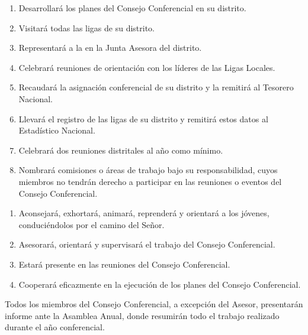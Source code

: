 \begin{enumerate}[noitemsep]
    \item Desarrollará los planes del Consejo Conferencial en su distrito.
    \item Visitará todas las ligas de su distrito.
    \item Representará a la \LMJ{} en la Junta Asesora del distrito.
    \item Celebrará reuniones de orientación con los líderes de las Ligas Locales.
    \item Recaudará la asignación conferencial de su distrito y la remitirá al Tesorero Nacional.
    \item Llevará el registro de las ligas de su distrito y remitirá estos datos al Estadístico Nacional.
    \item Celebrará dos reuniones distritales al año como mínimo.
    \item Nombrará comisiones o áreas de trabajo bajo su responsabilidad, cuyos miembros no tendrán derecho a participar en las reuniones o eventos del Consejo Conferencial.
\end{enumerate}

\begin{enumerate}[noitemsep]
    \item Aconsejará, exhortará, animará, reprenderá y orientará a los jóvenes, conduciéndolos por el camino del Señor.
    \item Asesorará, orientará y supervisará el trabajo del Consejo Conferencial.
    \item Estará presente en las reuniones del Consejo Conferencial.
    \item Cooperará eficazmente en la ejecución de los planes del Consejo Conferencial.
\end{enumerate}

\article
\label{informes-consejo}
Todos los miembros del Consejo Conferencial, a excepción del Asesor, presentarán informe ante la Asamblea Anual, donde resumirán todo el trabajo realizado durante el año conferencial.

